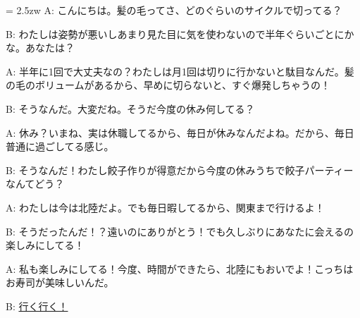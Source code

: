 \documentclass[11pt]{amsart}
\title{}
\author{}
\newenvironment{hangall}[1]{\hangindent = 2.5zw\everypar{\hangindent = 2.5zw}}{}
\begin{document}
\maketitle
\begin{hangall}{}%
A: こんにちは。髪の毛ってさ、どのぐらいのサイクルで切ってる？

B: わたしは姿勢が悪いしあまり見た目に気を使わないので半年ぐらいごとにかな。あなたは？

A: 半年に1回で大丈夫なの？わたしは月1回は切りに行かないと駄目なんだ。髪の毛のボリュームがあるから、早めに切らないと、すぐ爆発しちゃうの！

B: そうなんだ。大変だね。そうだ今度の休み何してる？

A: 休み？いまね、実は休職してるから、毎日が休みなんだよね。だから、毎日普通に過ごしてる感じ。

B: そうなんだ！わたし餃子作りが得意だから今度の休みうちで餃子パーティーなんてどう？

A: わたしは今は北陸だよ。でも毎日暇してるから、関東まで行けるよ！

B: そうだったんだ！？遠いのにありがとう！でも久しぶりにあなたに会えるの楽しみにしてる！

A: 私も楽しみにしてる！今度、時間ができたら、北陸にもおいでよ！こっちはお寿司が美味しいんだ。

B: \ul{行く行く！}\end{hangall}
\end{document}
